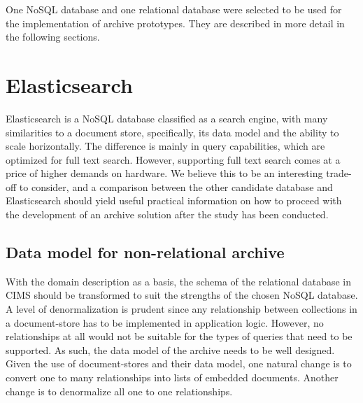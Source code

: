 One NoSQL database and one relational database were selected to be used for the implementation of archive prototypes. They are described in more detail in the following sections.


\section{Elasticsearch}
Elasticsearch \cite{elastic} is a NoSQL database classified as a search engine, with many similarities to a document store, specifically, its data model and the ability to scale horizontally. The difference is mainly in query capabilities, which are optimized for full text search. However, supporting full text search comes at a price of higher demands on hardware. We believe this to be an interesting trade-off to consider, and a comparison between the other candidate database and Elasticsearch should yield useful practical information on how to proceed with the development of an archive solution after the study has been conducted.

\subsection{Data model for non-relational archive} \label{nosqlmodel}
With the domain description as a basis, the schema of the relational database in CIMS should be transformed to suit the strengths of the chosen NoSQL database. A level of denormalization is prudent since any relationship between collections in a document-store has to be implemented in application logic. However, no relationships at all would not be suitable for the types of queries that need to be supported. As such, the data model of the archive needs to be well designed. Given the use of document-stores and their data model, one natural change is to convert one to many relationships into lists of embedded documents. Another change is to denormalize all one to one relationships.

